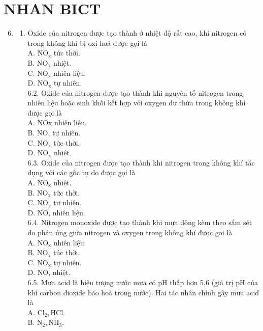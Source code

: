 \documentclass[10pt]{article}
\begin{document}
\section*{NHAN BICT}
\begin{enumerate}
  \setcounter{enumi}{5}
  \item 
  \begin{enumerate}
    \item Oxide của nitrogen được tạo thành ở nhiệt độ rất cao, khi nitrogen có trong không khí bị oxi hoá được gọi là\\
A. $\mathrm{NO}_{\mathrm{x}}$ tức thời.\\
B. $\mathrm{NO}_{\mathrm{x}}$ nhiệt.\\
C. $\mathrm{NO}_{\mathrm{x}}$ nhiên liệu.\\
D. $\mathrm{NO}_{\mathrm{x}}$ tự nhiên.\\
6.2. Oxide của nitrogen được tạo thành khi nguyên tố nitrogen trong nhiên liệu hoặc sinh khối kết hợp với oxygen dư thừa trong không khí được gọi là\\
A. NOx nhiên liệu.\\
B. NO, tự nhiên.\\
C. $\mathrm{NO}_{\mathrm{x}}$ tức thời.\\
D. $\mathrm{NO}_{\mathrm{x}}$ nhiêt.\\
6.3. Oxide của nitrogen được tạo thành khi nitrogen trong không khí tác dụng với các gốc tụ do được gọi là\\
A. $\mathrm{NO}_{\mathrm{x}}$ nhiệt.\\
B. $\mathrm{NO}_{\mathrm{x}}$ tức thời.\\
C. $\mathrm{NO}_{\mathrm{x}}$ tư nhiên.\\
D. NO, nhiên liệu.\\
6.4. Nitrogen monoxide được tạo thành khi mưa dông kèm theo sấm sét do phản úng giữa nitrogen và oxygen trong không khí được goi là\\
A. $\mathrm{NO}_{\mathrm{x}}$ nhiên liệu.\\
B. $\mathrm{NO}_{\mathrm{x}}$ túc thời.\\
C. $\mathrm{NO}_{\mathrm{x}}$ tự nhiên.\\
D. NO, nhiệt.\\
6.5. Mưa acid là hiện tượng nước mưa có pH thấp hơn 5,6 (giá trị pH của khí carbon dioxide bão hoà trong nước). Hai tác nhân chính gây mưa acid là\\
A. $\mathrm{Cl}_{2}, \mathrm{HCl}$.\\
B. $\mathrm{N}_{2}, \mathrm{NH}_{3}$.\\

\end{enumerate}
\end{enumerate}
\end{document}
